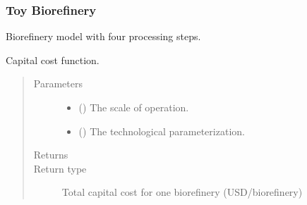 \documentclass[letterpaper,10pt,english]{sphinxmanual}
\begin{document}
\subsubsection{Toy Biorefinery}
\label{\detokenize{technology:module-technology.tutorial_biorefinery}}\label{\detokenize{technology:toy-biorefinery}}
Biorefinery model with four processing steps.

\begin{fulllineitems}
\label{\detokenize{technology:technology.tutorial_biorefinery.capital_cost}}
Capital cost function.
\begin{quote}\begin{description}
\item[{Parameters}] \leavevmode\begin{itemize}
\item {} 
 () \textendash{} The scale of operation.

\item {} 
 () \textendash{} The technological parameterization.

\end{itemize}

\item[{Returns}] \leavevmode


\item[{Return type}] \leavevmode
Total capital cost for one biorefinery (USD/biorefinery)

\end{description}\end{quote}

\end{fulllineitems}

\end{document}
